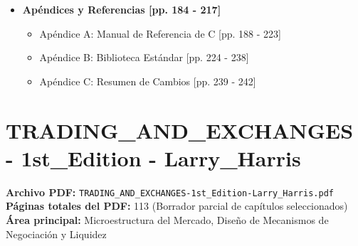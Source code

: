 \documentclass[11pt,a4paper]{article}
\begin{document}
\begin{itemize}
    \item \textbf{Apéndices y Referencias [pp. 184 - 217]}
    \begin{itemize}
        \item Apéndice A: Manual de Referencia de C [pp. 188 - 223]
        \item Apéndice B: Biblioteca Estándar [pp. 224 - 238]
        \item Apéndice C: Resumen de Cambios [pp. 239 - 242]
    \end{itemize}
\end{itemize}

\newpage

\section{TRADING\_AND\_EXCHANGES - 1st\_Edition - Larry\_Harris}
\textbf{Archivo PDF:} \texttt{TRADING\_AND\_EXCHANGES-1st\_Edition-Larry\_Harris.pdf} \\
\textbf{Páginas totales del PDF:} 113 (Borrador parcial de capítulos seleccionados) \\
\textbf{Área principal:} Microestructura del Mercado, Diseño de Mecanismos de Negociación y Liquidez
\end{document}
